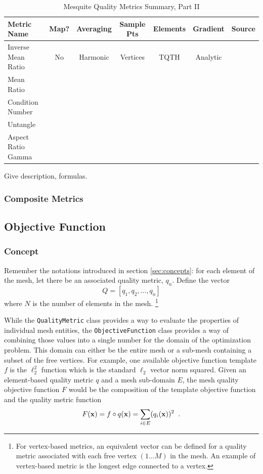 \begin{table}[h]
\begin{center}
\begin{tabular}{|l|c|c|c|c|c|c|}
\hline
Metric Name & Map? & Averaging & Sample Pts & Elements & Gradient & Source \\ \hline
Inverse Mean Ratio & No & Harmonic & Vertices & TQTH & Analytic & \\ 
Mean Ratio &  &  &  &  &  \\ 
Condition Number &  &  &  &  &  \\ 
Untangle &  &  &  &  &  \\ 
Aspect Ratio Gamma &  &  &  &  &  \\ 
\hline
\end{tabular}
\caption{\label{QualityMetrics2} Mesquite Quality Metrics Summary, Part II}
\end{center}
\end{table}

 \newline
Give description, formulas. 

\subsubsection{Composite Metrics}

\subsection{Objective Function} \label{sec:ObjectiveFunction}

\subsubsection{Concept}
Remember the notations introduced in section \ref{sec:concepts}:
for each element of the mesh, let there be an associated quality metric, 
$q_n$.  Define the vector 
\begin{equation}
Q = [ q_1, q_2, \ldots, q_n ]
\end{equation}
where $N$ is the number of elements in the mesh. \footnote{For vertex-based metrics, an equivalent vector can be defined for a
quality metric associated with each free vertex $(1 \dots M)$ in the mesh. An example of vertex-based
metric is the longest edge connected to a vertex.}

While the \texttt{QualityMetric} class provides a way to evaluate the
properties of individual mesh entities, the \texttt{ObjectiveFunction}
class provides a way of combining those values into a single number
for the domain of the optimization problem.  This domain can either be
the entire mesh or a sub-mesh containing a subset of the free vertices.
For example, one available objective function template $f$ is the $\ell_{2}^2$
function which is the standard $\ell_{2}$ vector norm squared.  
Given an element-based quality metric $q$ and a mesh sub-domain $E$, the mesh 
quality objective function $F$ would be the composition of the template
objective function and the quality metric function 
\begin{equation}
F({\bf x}) = f \circ q({\bf x}) = \sum_{i \in E} (q_i({\bf x}))^2 \;\; .
\end{equation}

